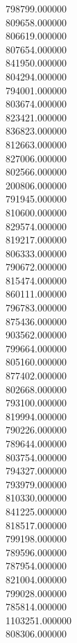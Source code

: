 798799.000000\\
809658.000000\\
806619.000000\\
807654.000000\\
841950.000000\\
804294.000000\\
794001.000000\\
803674.000000\\
823421.000000\\
836823.000000\\
812663.000000\\
827006.000000\\
802566.000000\\
200806.000000\\
791945.000000\\
810600.000000\\
829574.000000\\
819217.000000\\
806333.000000\\
790672.000000\\
815474.000000\\
860111.000000\\
796783.000000\\
875436.000000\\
903562.000000\\
799664.000000\\
805160.000000\\
877402.000000\\
802668.000000\\
793100.000000\\
819994.000000\\
790226.000000\\
789644.000000\\
803754.000000\\
794327.000000\\
793979.000000\\
810330.000000\\
841225.000000\\
818517.000000\\
799198.000000\\
789596.000000\\
787954.000000\\
821004.000000\\
799028.000000\\
785814.000000\\
1103251.000000\\
808306.000000\\
